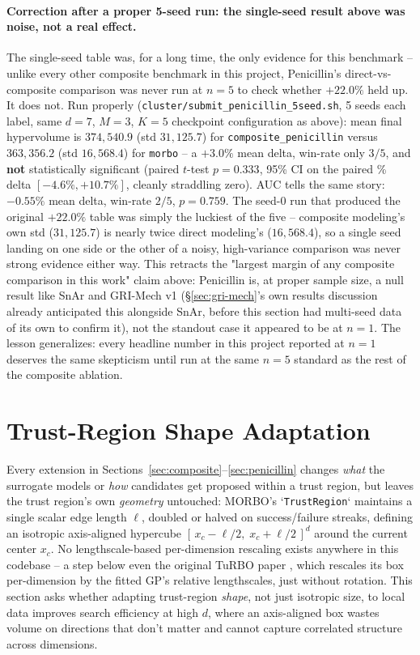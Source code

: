 \documentclass[11pt]{article}
\begin{document}
\paragraph{Correction after a proper 5-seed run: the single-seed result
above was noise, not a real effect.} The single-seed table was, for a
long time, the only evidence for this benchmark -- unlike every other
composite benchmark in this project, Penicillin's direct-vs-composite
comparison was never run at $n=5$ to check whether $+22.0\%$ held up. It
does not. Run properly (\texttt{cluster/submit\_penicillin\_5seed.sh},
5 seeds each label, same $d{=}7$, $M{=}3$, $K{=}5$ checkpoint
configuration as above): mean final hypervolume is $374{,}540.9$ (std
$31{,}125.7$) for \texttt{composite\_penicillin} versus $363{,}356.2$
(std $16{,}568.4$) for \texttt{morbo} -- a $+3.0\%$ mean delta, win-rate
only $3/5$, and \textbf{not} statistically significant (paired $t$-test
$p=0.333$, 95\% CI on the paired \% delta $[-4.6\%,+10.7\%]$, cleanly
straddling zero). AUC tells the same story: $-0.55\%$ mean delta,
win-rate $2/5$, $p=0.759$. The seed-0 run that produced the original
$+22.0\%$ table was simply the luckiest of the five -- composite
modeling's own std ($31{,}125.7$) is nearly twice direct modeling's
($16{,}568.4$), so a single seed landing on one side or the other of a
noisy, high-variance comparison was never strong evidence either way.
This retracts the "largest margin of any composite comparison in this
work" claim above: Penicillin is, at proper sample size, a null result
like SnAr and GRI-Mech v1 (\S\ref{sec:gri-mech}'s own results
discussion already anticipated this alongside SnAr, before this section
had multi-seed data of its own to confirm it), not the standout case it
appeared to be at $n=1$. The lesson generalizes: every headline number
in this project reported at $n=1$ deserves the same skepticism until
run at the same $n=5$ standard as the rest of the composite ablation.

\section{Trust-Region Shape Adaptation}
\label{sec:tr-shape}

Every extension in Sections~\ref{sec:composite}--\ref{sec:penicillin}
changes \emph{what} the surrogate models or \emph{how} candidates get
proposed within a trust region, but leaves the trust region's own
\emph{geometry} untouched: MORBO's `\texttt{TrustRegion}` maintains a single
scalar edge length $\ell$, doubled or halved on success/failure streaks,
defining an isotropic axis-aligned hypercube
$[\,x_c - \ell/2,\; x_c + \ell/2\,]^d$ around the current center $x_c$. No
lengthscale-based per-dimension rescaling exists anywhere in this
codebase -- a step below even the original TuRBO paper
\citep{eriksson2019turbo}, which rescales its box per-dimension by the
fitted GP's relative lengthscales, just without rotation. This section asks
whether adapting trust-region \emph{shape}, not just isotropic size, to
local data improves search efficiency at high $d$, where an axis-aligned
box wastes volume on directions that don't matter and cannot capture
correlated structure across dimensions.
\end{document}
